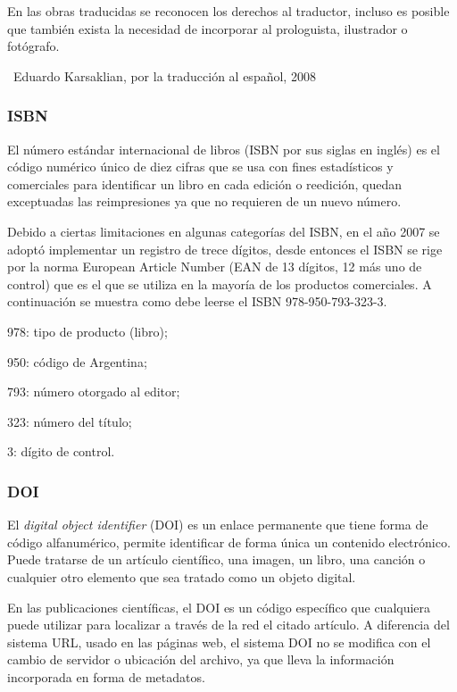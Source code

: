 \documentclass{book}
\begin{document}
{{{{{{{{{En las obras traducidas se reconocen los derechos al traductor, incluso es posible que también exista la necesidad de incorporar al prologuista, ilustrador o fotógrafo.

\begin{mdframed}[linewidth=.5pt,linecolor=black!30,roundcorner=3pt,backgroundcolor=yellow!15]
\noindent \textcopyright~Eduardo Karsaklian, por la traducción al español, 2008
\end{mdframed}

\subsubsection{ISBN}

El número estándar internacional de libros (ISBN por sus siglas en inglés) es el código numérico único de diez cifras que se usa con fines estadísticos y comerciales para identificar un libro en cada edición o reedición, quedan exceptuadas las reimpresiones ya que no requieren de un nuevo número.

Debido a ciertas limitaciones en algunas categorías del ISBN, en el año 2007 se adoptó implementar un registro de trece dígitos, desde entonces  el ISBN se rige por la norma European Article Number (EAN de 13 dígitos, 12 más uno de control) que es el que se utiliza en la mayoría de los productos comerciales. A continuación se muestra como debe leerse el ISBN 978-950-793-323-3.

\begin{compactitem}
\item 978: tipo de producto (libro);
\item 950: código de Argentina;
\item 793: número otorgado al editor;
\item 323: número del título;
\item 3: dígito de control.
\end{compactitem}

\subsubsection{DOI}

El \emph{digital object identifier} (DOI) es un enlace permanente que tiene forma de código alfanumérico, permite identificar de forma única un contenido electrónico. Puede tratarse de un artículo científico, una imagen, un libro, una canción o cualquier otro elemento que sea tratado como un objeto digital.

En las publicaciones científicas, el DOI es un código específico que cualquiera puede utilizar para localizar a través de la red el citado artículo. A diferencia del sistema URL, usado en las páginas web, el sistema DOI no se modifica con el cambio de servidor o ubicación del archivo, ya que lleva la información incorporada en forma de metadatos.

}}}}}}}}}
\end{document}
